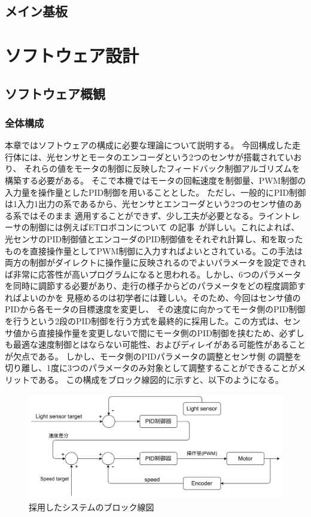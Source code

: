 \documentclass{ltjsreport}
\begin{document}
\section{メイン基板}







\chapter{ソフトウェア設計}
\section{ソフトウェア概観}
\subsection{全体構成}
本章ではソフトウェアの構成に必要な理論について説明する。
今回構成した走行体には、光センサとモータのエンコーダという2つのセンサが搭載されていおり、
それらの値をモータの制御に反映したフィードバック制御アルゴリズムを構築する必要がある。
そこで本機ではモータの回転速度を制御量、PWM制御の入力量を操作量としたPID制御を用いることとした。
ただし、一般的にPID制御は1入力1出力の系であるから、光センサとエンコーダという2つのセンサ値のある系ではそのまま
適用することができず、少し工夫が必要となる。ライントレーサの制御には例えばETロボコンについて
の記事~\cite{ETM}が詳しい。これによれば、光センサのPID制御値とエンコーダのPID制御値をそれぞれ計算し、和を取ったものを直接操作量としてPWM制御に入力すればよいとされている。この手法は両方の制御がダイレクトに操作量に反映されるのでよいパラメータを設定できれば非常に応答性が高いプログラムになると思われる。しかし、6つのパラメータを同時に調節する必要があり、走行の様子からどのパラメータをどの程度調節すればよいのかを
見極めるのは初学者には難しい。そのため、今回はセンサ値のPIDから各モータの目標速度を変更し、
その速度に向かってモータ側のPID制御を行うという2段のPID制御を行う方式を最終的に採用した。この方式は、センサ値から直接操作量を変更しないで間にモータ側のPID制御を挟むため、必ずしも最適な速度制御とはならない可能性、およびディレイがある可能性があることが欠点である。
しかし、モータ側のPIDパラメータの調整とセンサ側
の調整を切り離し、1度に3つのパラメータのみ対象として調整することができることがメリットである。
この構成をブロック線図的に示すと、以下のようになる。

\begin{figure}[tbh]
  \centering
  \includegraphics[keepaspectratio, scale=0.05]
       {img/block_line.drawio.png}
  \caption{採用したシステムのブロック線図}
  \label{fig:blockline}
 \end{figure}
\end{document}
